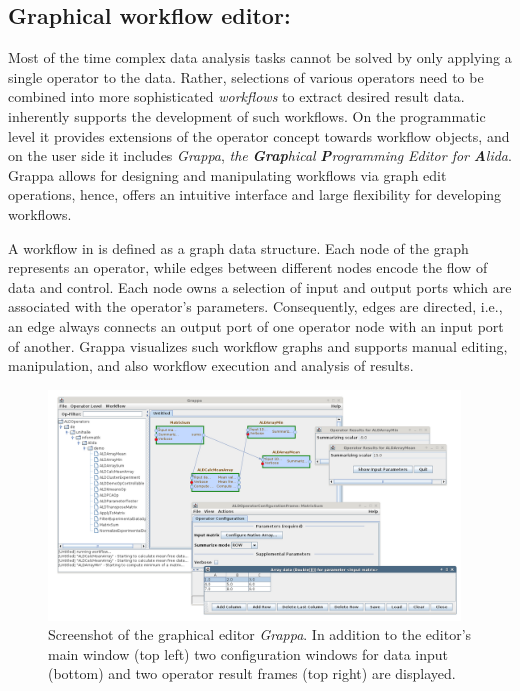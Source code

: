 \subsection{Graphical workflow editor: \grappa}
\label{subsec:grappa}
Most of the time complex data analysis tasks cannot be solved by only applying a
single operator to the data. Rather, selections of various operators need to be
combined into more sophisticated {\em workflows} to extract desired result data.
\alida inherently supports the development of such workflows. On the programmatic level it provides extensions of the operator concept 
towards workflow objects, and on the user side it includes {\em Grappa}, {\em the} {\bf \em Grap}{\em hical} {\bf \em P}{\em rogramming} 
{\em Editor for} {\bf \em A}{\em lida}. Grappa allows for designing and manipulating workflows via graph edit operations, hence, offers 
an intuitive interface and large flexibility for developing workflows.

A workflow in \alida is defined as a graph data structure. Each node of the graph represents an \alida operator, while edges between 
different nodes encode the flow of data and control. Each node owns a selection of input and output ports which are associated with the
operator's parameters. Consequently, edges are directed, i.e., an edge always
connects an output port of one operator node with an input port of another. Grappa visualizes such workflow graphs and supports manual editing, manipulation, and also workflow execution
and analysis of results.

\begin{center}
\begin{figure}[t]
\begin{center}
\includegraphics[width=0.975\textwidth,clip,trim = 15 20 10 10]
				{../images/screenShotGrappa.png}
\caption{\label{fig:grappaShot}Screenshot of the graphical editor {\em Grappa}.
In addition to the editor's main window (top left) two configuration windows for
data input (bottom) and two operator result frames (top right) are displayed.}
\end{center}
\end{figure}
\end{center}

